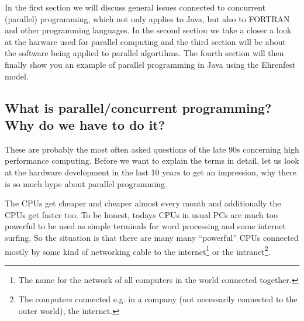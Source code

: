 In the first section we will discuss general issues connected to
concurrent (parallel) programming, which not only applies to Java, but
also to FORTRAN and other programming languages. In the second section
we take a closer a look at the harware used for parallel computing and
the third section will be about the software being applied to
parallel algortihms. The fourth section will then finally show you an
example of parallel programming in Java using the Ehrenfest model.

\subsection{What is parallel/concurrent programming?  \\
            Why do we have to do it?}

These are probably the most often asked questions of the late 90s
concerning high performance computing. 
Before we want to explain the terms in detail, let us look
at the hardware development in the last 10 years to get an impression,
why there is so much hype about parallel programming. 

The CPUs get cheaper and cheaper almost every month and additionally
the CPUs get faster too. To be honest, todays CPUs in usual PCs
are much too powerful to be used as simple terminals for word 
processing and some internet surfing. So the situation is that
there are many many ``powerful'' CPUs connected mostly by some kind
of networking cable to the internet\footnote{The name for the network of
all computers in the world connected together.} 
or the intranet\footnote{The computers connected e.g. in a company 
(not necessarily connected to the outer world), the internet.}.

